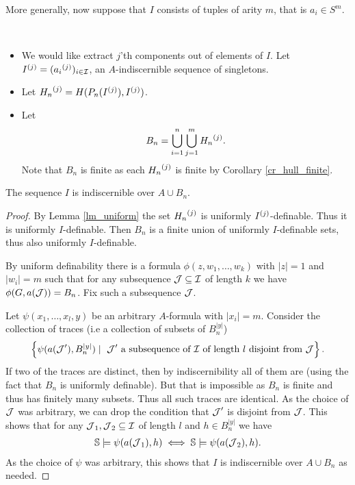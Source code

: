 More generally, now suppose that $I$ consists of tuples of arity $m$, that is $a_i \in S^m$.

\begin{Definition} \ 
  \begin{itemize}
  \item We would like extract $j$'th components out of elements of $I$.
    Let ${I}^{(j)} = ({a_i}^{(j)})_{i \in \operatorname{\mathcal I}}$, an $A$-indiscernible sequence of singletons.
  \item Let ${H_n}^{(j)} = H(P_n({I}^{(j)}), {I}^{(j)})$.
  \item Let
    \begin{align*}
      B_n = \bigcup_{i = 1}^{n} \bigcup_{j = 1}^{m} {H_n}^{(j)}.
    \end{align*}
    Note that $B_n$ is finite as each ${H_n}^{(j)}$ is finite by Corollary \ref{cr_hull_finite}.
  \end{itemize}
\end{Definition}

\begin{Lemma} \label{cr_bump}
  The sequence $I$ is indiscernible over $A \cup B_n$.
\end{Lemma}

\begin{proof}
  By Lemma \ref{lm_uniform} the set ${H_n}^{(j)}$ is uniformly ${I}^{(j)}$-definable.
  Thus it is uniformly $I$-definable.
  Then $B_n$ is a finite union of uniformly $I$-definable sets, thus also uniformly $I$-definable.

  By uniform definability there is a formula $\phi(z, w_1, \ldots , w_k)$ with $|z| = 1$ and $|w_i| = m$ such that
  for any subsequence $\operatorname{\mathcal J} \subseteq \operatorname{\mathcal I}$ of length $k$ we have $\phi(G, a(\operatorname{\mathcal J})) = B_n$.
  Fix such a subsequence $\operatorname{\mathcal J}$.

  Let $\psi(x_1, \ldots, x_l ,y)$ be an arbitrary $A$-formula with $|x_i| = m$. 
  Consider the collection of traces (i.e a collection of subsets of $B_n^{|y|}$)
  \begin{align*}
    \left\{\psi(a(\operatorname{\mathcal J}'), B_n^{|y|}) \mid \text{ $\operatorname{\mathcal J}'$ a subsequence of $\operatorname{\mathcal I}$ of length $l$ disjoint from $\operatorname{\mathcal J}$}\right\}.
  \end{align*}
  If two of the traces are distinct, then by indiscernibility all of them are (using the fact that $B_n$ is uniformly definable).
  But that is impossible as $B_n$ is finite and thus has finitely many subsets.
  Thus all such traces are identical.
  As the choice of $\operatorname{\mathcal J}$ was arbitrary, we can drop the condition that $\operatorname{\mathcal J}'$ is disjoint from $\operatorname{\mathcal J}$.
  This shows that for any $\operatorname{\mathcal J}_1, \operatorname{\mathcal J}_2 \subseteq \operatorname{\mathcal I}$ of length $l$ and $h \in B_n^{|y|}$ we have
  \begin{align*}
    \mathbb S \models \psi(a(\operatorname{\mathcal J}_1), h) \iff \mathbb S \models \psi(a(\operatorname{\mathcal J}_2), h)    .
  \end{align*}
  As the choice of $\psi$ was arbitrary, this shows that $I$ is indiscernible over $A \cup B_n$ as needed.
\end{proof}


